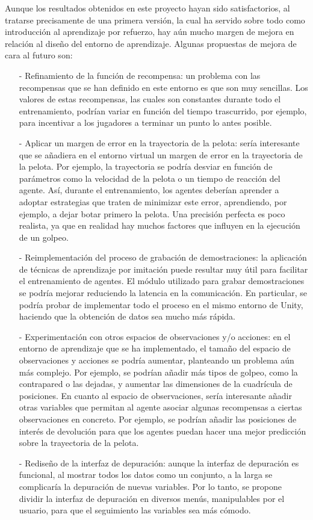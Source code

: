Aunque los resultados obtenidos en este proyecto hayan sido satisfactorios, al tratarse precisamente de una primera versión, la cual ha servido sobre todo como introducción al aprendizaje por refuerzo, hay aún mucho margen de mejora en relación al diseño del entorno de aprendizaje. Algunas propuestas de mejora de cara al futuro son:
\begin{enumerate}
    \item[-] Refinamiento de la función de recompensa: un problema con las recompensas que se han definido en este entorno es que son muy sencillas. Los valores de estas recompensas, las cuales son constantes durante todo el entrenamiento, podrían variar en función del tiempo trascurrido, por ejemplo, para incentivar a los jugadores a terminar un punto lo antes posible. 
    \newpage
    \item[-] Aplicar un margen de error en la trayectoria de la pelota: sería interesante que se añadiera en el entorno virtual un margen de error en la trayectoria de la pelota. Por ejemplo, la trayectoria se podría desviar en función de parámetros como la velocidad de la pelota o un tiempo de reacción del agente. Así, durante el entrenamiento, los agentes deberían aprender a adoptar estrategias que traten de minimizar este error, aprendiendo, por ejemplo, a dejar botar primero la pelota. Una precisión perfecta es poco realista, ya que en realidad hay muchos factores que influyen en la ejecución de un golpeo.
    \item[-] Reimplementación del proceso de grabación de demostraciones: la aplicación de técnicas de aprendizaje por imitación puede resultar muy útil para facilitar el entrenamiento de agentes. El módulo utilizado para grabar demostraciones se podría mejorar reduciendo la latencia en la comunicación. En particular, se podría probar de implementar todo el proceso en el mismo entorno de Unity, haciendo que la obtención de datos sea mucho más rápida.
    \item[-] Experimentación con otros espacios de observaciones y/o acciones: en el entorno de aprendizaje que se ha implementado, el tamaño del espacio de observaciones y acciones se podría aumentar, planteando un problema aún más complejo. Por ejemplo, se podrían añadir más tipos de golpeo, como la contrapared o las dejadas, y aumentar las dimensiones de la cuadrícula de posiciones. En cuanto al espacio de observaciones, sería interesante añadir otras variables que permitan al agente asociar algunas recompensas a ciertas observaciones en concreto. Por ejemplo, se podrían añadir las posiciones de interés de devolución para que los agentes puedan hacer una mejor predicción sobre la trayectoria de la pelota.
    \item[-] Rediseño de la interfaz de depuración: aunque la interfaz de depuración es funcional, al mostrar todos los datos como un conjunto, a la larga se complicaría la depuración de nuevas variables. Por lo tanto, se propone dividir la interfaz de depuración en diversos menús, manipulables por el usuario, para que el seguimiento las variables sea más cómodo.
\end{enumerate}